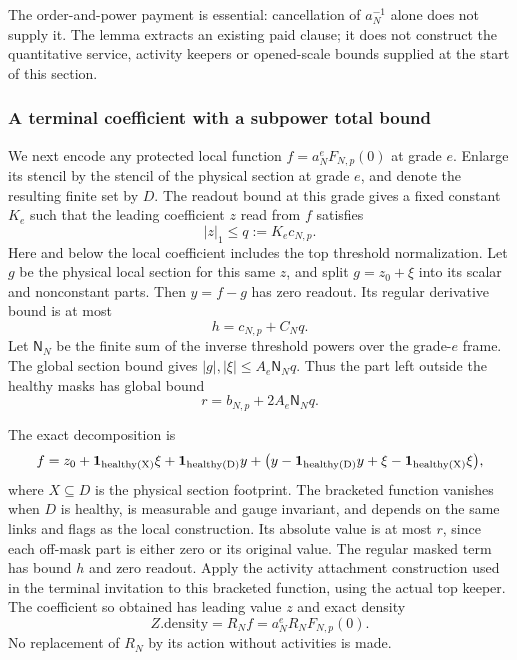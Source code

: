The order-and-power payment is essential: cancellation of $a_N^{-1}$
alone does not supply it. The lemma extracts an existing paid clause;
it does not construct the quantitative service, activity keepers or
opened-scale bounds supplied at the start of this section.

\subsubsection{A terminal coefficient with a subpower total bound}

We next encode any protected local function $f=a_N^eF_{N,p}(0)$ at
grade $e$. Enlarge its stencil by the stencil of the physical section
at grade $e$, and denote the resulting finite set by $D$. The readout
bound at this grade gives a fixed constant $K_e$ such that the leading
coefficient $z$ read from $f$ satisfies
\[
                              |z|_1\le q:=K_ec_{N,p}.
\]
Here and below the local coefficient includes the top threshold
normalization. Let $g$ be the physical local section for this same $z$,
and split $g=z_0+\xi$ into its scalar and nonconstant parts. Then
$y=f-g$ has zero readout. Its regular derivative bound is at most
\[
                            h=c_{N,p}+C_Nq.
\]
Let $\mathsf N_N$ be the finite sum of the inverse threshold powers
over the grade-$e$ frame. The global section bound gives
$|g|,|\xi|\le A_e\mathsf N_Nq$. Thus the part left outside the healthy
masks has global bound
\[
                            r=b_{N,p}+2A_e\mathsf N_Nq.
\]

The exact decomposition is
\begin{equation}\label{eq:relay-protected-split}
 f=z_0+\mathbf1_{\rm healthy(X)}\xi
       +\mathbf1_{\rm healthy(D)}y
       +\bigl(y-\mathbf1_{\rm healthy(D)}y
                       +\xi-\mathbf1_{\rm healthy(X)}\xi\bigr),
\end{equation}
where $X\subseteq D$ is the physical section footprint. The bracketed
function vanishes when $D$ is healthy, is measurable and gauge invariant,
and depends on the same links and flags as the local construction. Its
absolute value is at most $r$, since each off-mask part is either zero
or its original value. The regular masked term has bound $h$ and zero
readout. Apply the activity attachment construction used in the terminal
invitation to this bracketed function, using the actual top keeper.
The coefficient so obtained has leading value $z$ and exact density
\[
                         Z.\mathrm{density}=R_N f
                                            =a_N^eR_NF_{N,p}(0).
\]
No replacement of $R_N$ by its action without activities is made.

